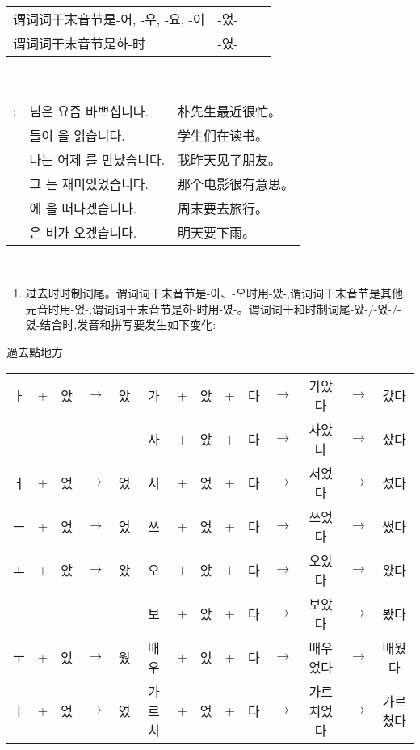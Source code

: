 \begin{grammar}
\begin{grammarsect}[时制]
\begin{tabular}{|l|c|c|c|}
			谓词词干末音节是-어, -우, -요, -이                 & -었- &                       &                      \\\cline{1-2}
			谓词词干末音节是하-时                            & -였- &                       &                      \\\hline
		\end{tabular}\\
		\begin{tabular}{lll}
			\ruby{例}{예}: & \ruby{朴}{박} \ruby{先生}{선생}님은 요즘 바쁘십니다. & 朴先生最近很忙。  \\
			             & \ruby{學生}{학생}들이 \ruby{冊}{책}을 읽습니다.   & 学生们在读书。   \\
			             & 나는 어제 \ruby{親舊}{친구}를 만났습니다.           & 我昨天见了朋友。  \\
			             & 그 \ruby{映畫}{영화}는 재미있었습니다.             & 那个电影很有意思。 \\
			             & \ruby{週末}{주말}에 \ruby{旅行}{여행}을 떠나겠습니다. & 周末要去旅行。   \\
			             & \ruby{來日}{내일}은 비가 오겠습니다.              & 明天要下雨。
		\end{tabular}\\
	\end{grammarsect}
	\begin{grammarsect}[-았-/-었-/-였-]
		\begin{enumerate}
			\item 过去时时制词尾。谓词词干末音节是-아、-오时用-았-,谓词词干末音节是其他元音时用-었-,谓词词干末音节是하-时用-였-。谓词词干和时制词尾-았-/-었-/-였-结合时,发音和拼写要发生如下变化:
		\end{enumerate}
		{\color{white} 過去點地方}
		\begin{tabular}{|ccccc|ccccccccc|}
			\hline
			ㅏ & + & 았 & $\to$ & 았 & 가   & + & 았 & + & 다 & $\to$ & 가았다   & $\to$ & 갔다   \\
			  &   &   &       &   & 사   & + & 았 & + & 다 & $\to$ & 사았다   & $\to$ & 샀다   \\
			ㅓ & + & 었 & $\to$ & 었 & 서   & + & 었 & + & 다 & $\to$ & 서었다   & $\to$ & 섰다   \\
			ㅡ & + & 었 & $\to$ & 었 & 쓰   & + & 었 & + & 다 & $\to$ & 쓰었다   & $\to$ & 썼다   \\\hline
			ㅗ & + & 았 & $\to$ & 왔 & 오   & + & 았 & + & 다 & $\to$ & 오았다   & $\to$ & 왔다   \\
			  &   &   &       &   & 보   & + & 았 & + & 다 & $\to$ & 보았다   & $\to$ & 봤다   \\
			ㅜ & + & 었 & $\to$ & 웠 & 배우  & + & 었 & + & 다 & $\to$ & 배우었다  & $\to$ & 배웠다  \\
			ㅣ & + & 었 & $\to$ & 였 & 가르치 & + & 었 & + & 다 & $\to$ & 가르치었다 & $\to$ & 가르쳤다 \\\hline
		\end{tabular}\\


\end{grammarsect}
\end{grammar}
